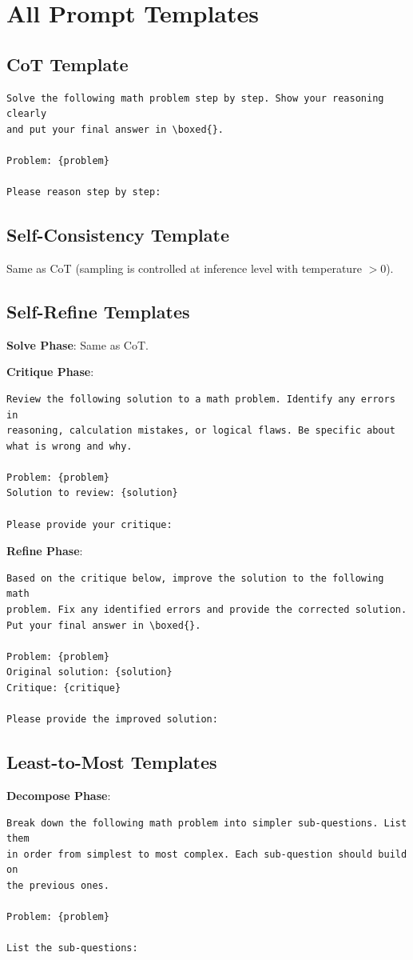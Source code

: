 \documentclass[conference]{IEEEtran}
\begin{document}
\section{All Prompt Templates}
\label{sec:all_prompts}

\subsection{CoT Template}

\begin{lstlisting}
Solve the following math problem step by step. Show your reasoning clearly
and put your final answer in \boxed{}.

Problem: {problem}

Please reason step by step:
\end{lstlisting}

\subsection{Self-Consistency Template}
Same as CoT (sampling is controlled at inference level with temperature $> 0$).

\subsection{Self-Refine Templates}
\textbf{Solve Phase}: Same as CoT.

\textbf{Critique Phase}:
\begin{lstlisting}
Review the following solution to a math problem. Identify any errors in
reasoning, calculation mistakes, or logical flaws. Be specific about
what is wrong and why.

Problem: {problem}
Solution to review: {solution}

Please provide your critique:
\end{lstlisting}

\textbf{Refine Phase}:
\begin{lstlisting}
Based on the critique below, improve the solution to the following math
problem. Fix any identified errors and provide the corrected solution.
Put your final answer in \boxed{}.

Problem: {problem}
Original solution: {solution}
Critique: {critique}

Please provide the improved solution:
\end{lstlisting}

\subsection{Least-to-Most Templates}
\textbf{Decompose Phase}:
\begin{lstlisting}
Break down the following math problem into simpler sub-questions. List them
in order from simplest to most complex. Each sub-question should build on
the previous ones.

Problem: {problem}

List the sub-questions:
\end{lstlisting}
\end{document}
